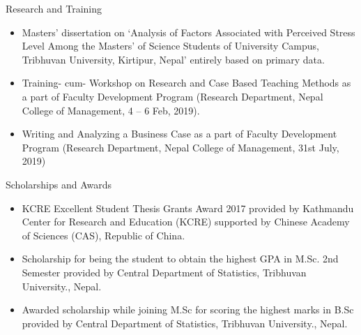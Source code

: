 \documentclass{resume}
\begin{document}
\begin{rSection}{Research and Training} 
\begin{itemize}
    \item Masters' dissertation on ‘Analysis of Factors Associated with 
    Perceived Stress Level Among the Masters’ of Science Students of 
    University Campus, Tribhuvan University, Kirtipur, Nepal’ entirely based on 
    primary data.
    \item Training- cum- Workshop on Research and Case Based Teaching Methods as
    a part  of Faculty Development Program (Research Department, Nepal College 
    of Management, 4 – 6 Feb, 2019).
    \item Writing and Analyzing a Business Case as a part of Faculty Development
    Program (Research Department, Nepal College of Management, 31st July, 2019)
\end{itemize}
\end{rSection}

\begin{rSection}{Scholarships and Awards} 
\begin{itemize}
    \item KCRE Excellent Student Thesis Grants Award 2017 provided by Kathmandu
    Center for Research and Education (KCRE) supported by Chinese Academy of 
    Sciences (CAS), Republic of China.
    \item Scholarship for being the student to obtain the highest GPA in M.Sc. 
    2nd Semester provided by Central Department of Statistics, Tribhuvan 
    University., Nepal. 
    \item Awarded scholarship while joining M.Sc for scoring the highest marks 
    in B.Sc provided by Central Department of Statistics, Tribhuvan University.,
    Nepal.

\end{itemize}
\end{rSection}
\end{document}
